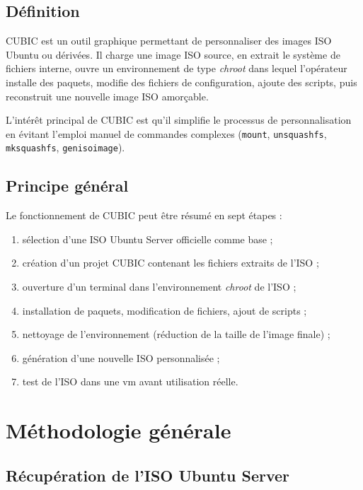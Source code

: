 \subsection{Définition}

CUBIC est un outil graphique permettant de personnaliser des images ISO Ubuntu ou dérivées. Il charge une image ISO source, en extrait le système de fichiers interne, ouvre un environnement de type \emph{chroot} dans lequel l'opérateur installe des paquets, modifie des fichiers de configuration, ajoute des scripts, puis reconstruit une nouvelle image ISO amorçable.

L'intérêt principal de CUBIC est qu'il simplifie le processus de personnalisation en évitant l'emploi manuel de commandes complexes (\texttt{mount}, \texttt{unsquashfs}, \texttt{mksquashfs}, \texttt{genisoimage}).

\subsection{Principe général}

Le fonctionnement de CUBIC peut être résumé en sept étapes :

\begin{enumerate}[leftmargin=*]
    \item sélection d'une ISO Ubuntu Server officielle comme base ;
    \item création d'un projet CUBIC contenant les fichiers extraits de l'ISO ;
    \item ouverture d'un terminal dans l'environnement \emph{chroot} de l'ISO ;
    \item installation de paquets, modification de fichiers, ajout de scripts ;
    \item nettoyage de l'environnement (réduction de la taille de l'image finale) ;
    \item génération d'une nouvelle ISO personnalisée ;
    \item test de l'ISO dans une \acrshort{vm} avant utilisation réelle.
\end{enumerate}

\section{Méthodologie générale}

\subsection{Récupération de l'ISO Ubuntu Server}

